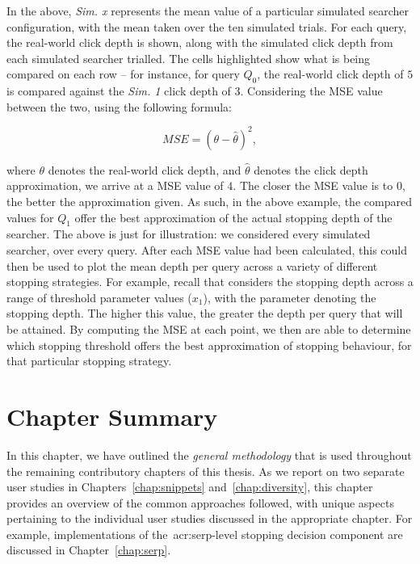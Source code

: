 In the above, \emph{Sim. x} represents the mean value of a particular simulated searcher configuration, with the mean taken over the ten simulated trials. For each query, the real-world click depth is shown, along with the simulated click depth from each simulated searcher trialled. The cells highlighted show what is being compared on each row -- for instance, for query $Q_0$, the real-world click depth of $5$ is compared against the \emph{Sim. 1} click depth of $3$. Considering the MSE value between the two, using the following formula:

\begin{equation*}
MSE = (\theta - \hat{\theta})^{2},
\end{equation*}

where $\theta$ denotes the real-world click depth, and $\hat{\theta}$ denotes the click depth approximation, we arrive at a MSE value of $4$. The closer the MSE value is to $0$, the better the approximation given. As such, in the above example, the compared values for $Q_1$ offer the best approximation of the actual stopping depth of the searcher. The above is just for illustration: we considered every simulated searcher, over every query. After each MSE value had been calculated, this could then be used to plot the mean depth per query across a variety of different stopping strategies. For example, recall that  considers the stopping depth across a range of threshold parameter values ($x_1$), with the parameter denoting the stopping depth. The higher this value, the greater the depth per query that will be attained. By computing the MSE at each point, we then are able to determine which stopping threshold offers the best approximation of stopping behaviour, for that particular stopping strategy.

\section{Chapter Summary}
In this chapter, we have outlined the \emph{general methodology} that is used throughout the remaining contributory chapters of this thesis. As we report on two separate user studies in Chapters~\ref{chap:snippets} and~\ref{chap:diversity}, this chapter provides an overview of the common approaches followed, with unique aspects pertaining to the individual user studies discussed in the appropriate chapter. For example, implementations of the~\gls{acr:serp}-level stopping decision component are discussed in Chapter~\ref{chap:serp}.

